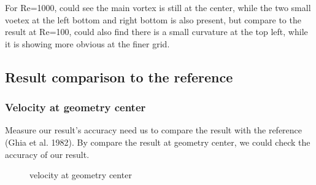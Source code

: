 \documentclass[12pt]{article}
\begin{document}
For Re=1000, could see the main vortex 
is still at the center, while the two 
small voetex at the left bottom and 
right bottom is also present, 
but compare to the result at Re=100, 
could also find there is a small curvature 
at the top left, while it is showing 
more obvious at the finer grid.



\subsection{Result comparison to the reference}

\subsubsection{Velocity at geometry center}

Measure our result's accuracy need us to compare the result with the reference (Ghia et al. 1982)\cite{GHIA1982387}. By compare the result at geometry center, we could check the accuracy of our result. 


\begin{figure}[H]
    \centering
    \caption{velocity at geometry center}
\end{figure}
\end{document}
